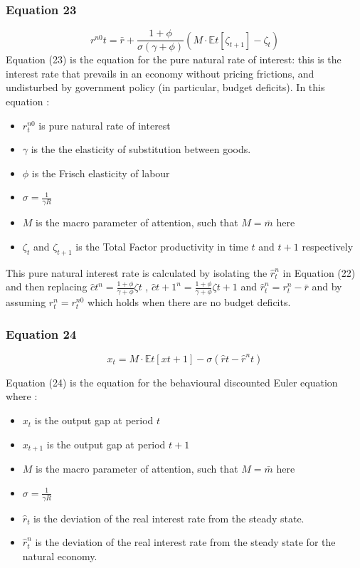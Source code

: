 \documentclass{article}
\begin{document}
\subsubsection*{Equation 23}
\begin{equation}
    r^{n0}{t}=\bar{r}+\frac{1+\phi}{\sigma(\gamma+\phi)}\left(M\cdot\mathbb{E}{t}\left[\zeta_{t+1}\right]-\zeta_{t}\right)
\end{equation}
Equation (23) is the equation for the pure natural rate of interest: this is the interest rate that prevails in an economy without pricing frictions, and undisturbed by government policy (in particular, budget deficits). In this equation : 
\begin{itemize}
    \item $r^{n0}_{t}$ is pure natural rate of interest
    \item $\gamma$ is the the elasticity of substitution between goods. 
    \item $\phi$ is the Frisch elasticity of labour
    \item $\sigma=\frac{1}{\gamma R}$ 
    \item $M$ is the macro parameter of attention, such that $M=\bar{m}$ here
    \item $\zeta_{t}$  and $\zeta_{t+1}$ is the Total Factor productivity in time $t$ and $t+1$ 
        respectively
\end{itemize}
    
This pure natural interest rate is calculated by isolating the $\hat r_{t}^{n}$ in Equation (22) and then replacing $\hat{c}{t}^{n}=\frac{1+\phi}{\gamma+\phi}\zeta{t}$ , $\hat{c}{t+1}^{n}=\frac{1+\phi}{\gamma+\phi}\zeta{t+1}$ and $\hat r_{t}^{n}=r_{t}^{n}-\bar{r}$ and by assuming $r_{t}^{n}=r^{n0}_{t}$ which holds when there are no budget deficits. 

\subsubsection*{Equation 24}
\begin{equation}
    x_{t}=M\cdot\mathbb{E}{t}\left[x{t+1}\right]-\sigma(\hat{r}{t}-\hat{r}^{n}{t})
\end{equation}

Equation (24) is the equation for the behavioural discounted Euler equation where : 
\begin{itemize}
    \item $x_{t}$ is the output gap at period $t$
    \item $x_{t+1}$ is the output gap at period $t+1$
    \item $M$ is the macro parameter of attention, such that $M=\bar{m}$ here
    \item $\sigma=\frac{1}{\gamma R}$ 
    \item $\hat r_{t}$ is the deviation of the real interest rate from the steady state.
    \item $\hat r_{t}^{n}$ is the deviation of the real interest rate from the steady state for the natural economy.
\end{itemize}
\end{document}
